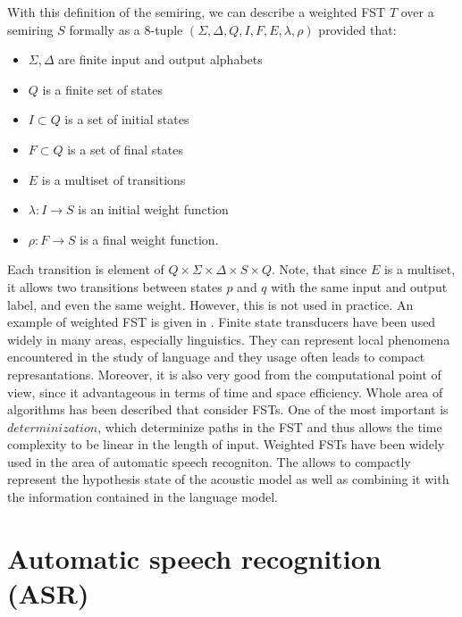 With this definition of the semiring, we can describe a weighted FST \cite{mohri2009weighted} $T$ over a semiring $S$ formally as a 8-tuple $(\Sigma,\Delta,Q,I,F,E,\lambda,\rho)$ provided that:
\begin{nobreak}
\begin{itemize}
\item $\Sigma, \Delta$ are finite input and output alphabets
\item $Q$ is a finite set of states
\item $I \subset Q$ is a set of initial states
\item $F \subset Q$ is a set of final states
\item $E$ is a multiset of transitions
\item $\lambda: I \rightarrow S$ is an initial weight function
\item $\rho: F \rightarrow S$ is a final weight function.
\end{itemize}
\end{nobreak}
Each transition is element of $Q \times \Sigma \times \Delta \times S \times Q$.
Note, that since $E$ is a multiset, it allows two transitions between states $p$ and $q$ with the same input
and output label, and even the same weight.
However, this is not used in practice.
An example of weighted FST is given in .
\linebreak\linebreak
Finite state transducers have been used widely in many areas, especially linguistics.
They can represent local phenomena encountered in the study of language and they usage often leads to compact represantations.
Moreover, it is also very good from the computational point of view, since it advantageous in terms of time and space efficiency.
Whole area of algorithms has been described that consider FSTs.
One of the most important is $determinization$, which determinize paths in the FST and thus allows the time complexity to be linear in the length of input.
Weighted FSTs have been widely used in the area of automatic speech recogniton.
The allows to compactly represent the hypothesis state of the acoustic model as well as combining it with the information contained in the language model.
\section{Automatic speech recognition (ASR)}
\label{ASR-desc}
